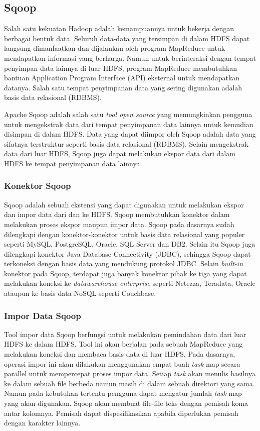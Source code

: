 \subsection{Sqoop}
\label{sec:sqoop}
Salah satu kekuatan Hadoop adalah kemampuannya untuk bekerja dengan berbagai bentuk data. Seluruh data-data yang tersimpan di dalam HDFS dapat langsung dimanfaatkan dan dijalankan oleh program MapReduce untuk mendapatkan informasi yang berharga. Namun untuk berinteraksi dengan tempat penyimpan data lainnya di luar HDFS, program MapReduce membutuhkan bantuan Application Program Interface (API) eksternal untuk mendapatkan datanya. Salah satu tempat penyimpanan data yang sering digunakan adalah basis data relasional (RDBMS).

Apache Sqoop adalah salah satu \textit{tool open source} yang memungkinkan pengguna untuk mengekstrak data dari tempat penyimpanan data lainnya untuk kemudian disimpan di dalam HDFS. Data yang dapat diimpor oleh Sqoop adalah data yang sifatnya terstruktur seperti basis data relasional (RDBMS). Selain mengekstrak data dari luar HDFS, Sqoop juga dapat melakukan ekspor data dari dalam HDFS ke tempat penyimpanan data lainnya.

\subsubsection{Konektor Sqoop}
\label{sec:konektor_sqoop}
Sqoop adalah sebuah ekstensi yang dapat digunakan untuk melakukan ekspor dan impor data dari dan ke HDFS. Sqoop membutuhkan konektor dalam melakukan proses ekspor maupun impor data. Sqoop pada dasarnya sudah dilengkapi dengan konektor-konektor untuk basis data relasional yang populer seperti MySQL, PostgreSQL, Oracle, SQL Server dan DB2. Selain itu Sqoop juga dilengkapi konektor Java Database Connectivity (JDBC), sehingga Sqoop dapat terkoneksi dengan basis data yang  mendukung protokol JDBC. Selain \textit{built-in} konektor pada Sqoop, terdapat juga banyak konektor pihak ke tiga yang dapat melakukan koneksi ke \textit{datawarehouse} \textit{enterprise} seperti Netezza, Teradata, Oracle ataupun ke basis data NoSQL seperti Couchbase. 

\subsubsection{Impor Data Sqoop}
\label{sec:impor_data_sqoop}
Tool impor data Sqoop berfungsi untuk melakukan pemindahan data dari luar HDFS ke dalam HDFS. Tool ini akan berjalan pada sebuah MapReduce yang melakukan koneksi dan membaca basis data di luar HDFS. Pada dasarnya, operasi impor ini akan dilakukan menggunakan empat buah \textit{task} map secara parallel untuk mempercepat proses impor data. Setiap \textit{task}  akan menulis hasilnya ke dalam sebuah file berbeda namun masih di dalam sebuah direktori yang sama. Namun pada kebutuhan tertentu pengguna dapat mengatur jumlah \textit{task} map yang akan digunakan. Sqoop akan membuat file-file teks dengan pemisah koma antar kolomnya. Pemisah dapat dispesifikasikan apabila diperlukan pemisah dengan karakter lainnya. 


